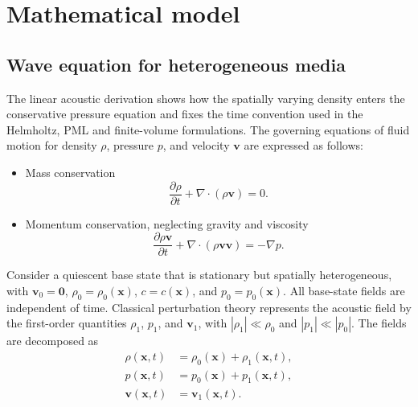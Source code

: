 \documentclass[final,12pt,nopreprintline,longtitle]{elsarticle}
\renewcommand{\v}{\mathbf{v}}
\newcommand{\x}{\mathbf{x}}
\begin{document}
\section{Mathematical model}
\label{sec:model}

\subsection{Wave equation for heterogeneous media}
The linear acoustic derivation shows how the spatially varying density
enters the conservative pressure equation and fixes the time convention used
in the Helmholtz, PML and finite-volume formulations.
The governing equations of fluid motion for density $\rho$, pressure $p$, and velocity $\v$ are expressed as follows:
\begin{itemize}
\item Mass conservation
        \begin{equation}
            \frac{\partial \rho}{\partial t} + \nabla\cdot(\rho \v)=0.
            \label{eq:massConserv}
        \end{equation}
        \item Momentum conservation, neglecting gravity and viscosity
        \begin{equation}
            \frac{\partial \rho \v}{\partial t} + \nabla\cdot(\rho \v\v)=-\nabla p.
            \label{eq:momConserv}
        \end{equation}
\end{itemize}

\begin{samepage}
Consider a quiescent base state that is stationary but spatially heterogeneous,
with $\v_0=\mathbf{0}$, $\rho_0=\rho_0(\x)$,
$c=c(\x)$, and $p_0=p_0(\x)$.  All base-state fields are independent of time.
Classical perturbation theory represents the acoustic field by the first-order
quantities $\rho_1$, $p_1$, and $\v_1$, with
$|\rho_1|\ll\rho_0$ and $|p_1|\ll|p_0|$.  The fields are decomposed as
    \begin{equation}
        \begin{aligned}
            \rho(\x,t) &= \rho_0(\x) + \rho_1(\x,t), \\
            p(\x,t) &= p_0(\x) + p_1(\x,t), \\
            \v(\x,t) &= \v_1(\x,t).
            \label{eq:1stPert}
        \end{aligned}
    \end{equation}
\end{samepage}
\end{document}
